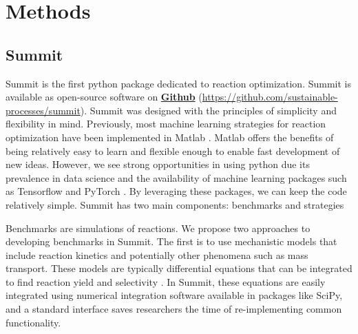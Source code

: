 

\section{Methods}

\subsection{Summit}
Summit is the first python package dedicated to reaction optimization. Summit is available as open-source software on \textbf{\href{https://github.com/sustainable-processes/summit}{Github}} (\href{https://github.com/sustainable-processes/summit}{https://github.com/sustainable-processes/summit}).  Summit was designed with the principles of simplicity and  flexibility in mind. Previously, most machine learning strategies for reaction optimization have been implemented in Matlab \cite{Krishnadasan2007, McMullen2010a, McMullen2011, Bourne2011, Moore2012, Reizman2016a, Fitzpatrick2016, Bradford2018,  Baumgartner2018}. Matlab offers the benefits of being relatively easy to learn and flexible enough to enable fast development of new ideas.  However, we see strong opportunities in using python due its prevalence in data science and the availability of machine learning packages such as Tensorflow \cite{tensorflow2015} and PyTorch \cite{Paszke2019}. By leveraging these packages, we can keep the code relatively simple. Summit has two main components: benchmarks and strategies
    
Benchmarks are simulations of reactions. We propose two approaches to developing benchmarks in Summit. The first is to use mechanistic models that include reaction kinetics and potentially other phenomena such as mass transport. These models are typically differential equations that can be integrated to find reaction yield and selectivity \cite{Reizman2015b, Baumgartner2018}. In Summit, these equations are easily integrated using numerical integration software available in packages like SciPy, \cite{2020SciPy-NMeth} and a standard interface saves researchers the time of re-implementing common functionality. 


